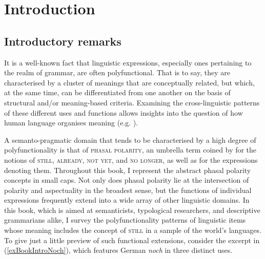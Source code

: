 \chapter{Introduction}
\section{Introductory remarks}
It is a well-known fact that linguistic expressions, especially ones pertaining to the realm of grammar, are often polyfunctional. That is to say, they are characterised by a cluster of meanings that are conceptually related, but which, at the same time, can be differentiated from one another on the basis of structural and/or meaning-based criteria. Examining the cross-linguistic patterns of these different uses and functions allows insights into the question of how human language organises meaning (e.g. \cite{Evans2010}).

A semanto-pragmatic domain that tends to be characterised by a high degree of polyfunctionality is that of \textsc{phasal polarity}, an umbrella term coined by \textcite{vanBaar1997} for the notions of \textsc{still}, \textsc{already}, \textsc{not yet}, and \textsc{no longer}, as well as for the expressions denoting them. Throughout this book, I represent the abstract phasal polarity concepts in small caps. Not only does phasal polarity lie at the intersection of polarity and aspectuality in the broadest sense, but the functions of individual expressions frequently extend into a wide array of other linguistic domains. In this book, which is aimed at semanticists, typological researchers, and descriptive grammarians alike, I survey the polyfunctionality patterns of linguistic items whose meaning includes the concept of \textsc{still} in a sample of the world's languages. To give just a little preview of such functional extensions, consider the excerpt in (\ref{exBookIntroNoch}), which features German \textit{noch} in three distinct uses.

